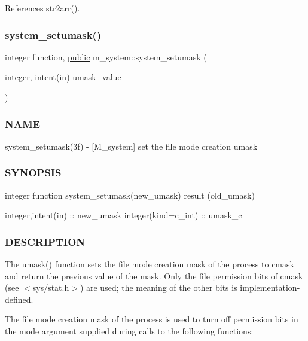 References str2arr().

\mbox{\label{namespacem__system_a04fd02e6f5ce2f8ecdfb577e1490feba}} 
\subsubsection{\texorpdfstring{system\+\_\+setumask()}{system\_setumask()}}
{\footnotesize\ttfamily integer function, \hyperlink{M__stopwatch_83_8txt_a2f74811300c361e53b430611a7d1769f}{public} m\+\_\+system\+::system\+\_\+setumask (\begin{DoxyParamCaption}\item[{integer, intent(\hyperlink{M__journal_83_8txt_afce72651d1eed785a2132bee863b2f38}{in})}]{umask\+\_\+value }\end{DoxyParamCaption})}



\subsubsection*{N\+A\+ME}

system\+\_\+setumask(3f) -\/ \mbox{[}M\+\_\+system\mbox{]} set the file mode creation umask \subsubsection*{S\+Y\+N\+O\+P\+S\+IS}

integer function system\+\_\+setumask(new\+\_\+umask) result (old\+\_\+umask)

integer,intent(in) \+:\+: new\+\_\+umask integer(kind=c\+\_\+int) \+:\+: umask\+\_\+c

\subsubsection*{D\+E\+S\+C\+R\+I\+P\+T\+I\+ON}

The umask() function sets the file mode creation mask of the process to cmask and return the previous value of the mask. Only the file permission bits of cmask (see $<$sys/stat.\+h$>$) are used; the meaning of the other bits is implementation-\/defined.

The file mode creation mask of the process is used to turn off permission bits in the mode argument supplied during calls to the following functions\+:


